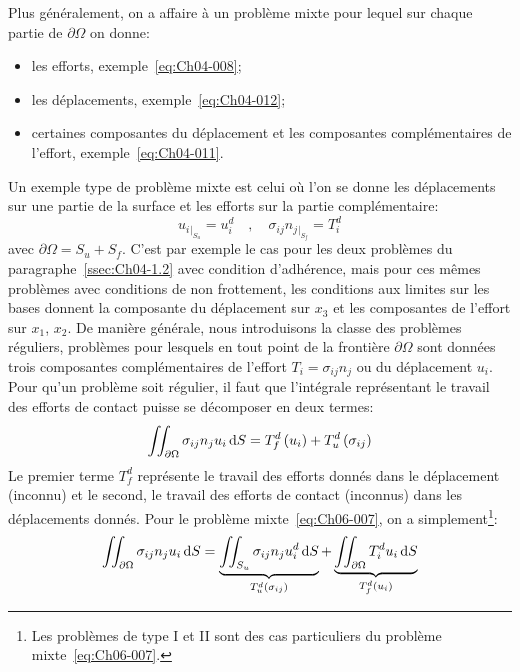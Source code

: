 Plus généralement, on a affaire à un problème mixte pour lequel sur chaque partie de $\partial \Omega$ on donne:
\begin{itemize}
    \item les efforts, exemple~\eqref{eq:Ch04-008}; 
    \item les déplacements, exemple~\eqref{eq:Ch04-012};
    \item certaines composantes du déplacement et les composantes complémentaires de l'effort, exemple~\eqref{eq:Ch04-011}.
\end{itemize}

Un exemple type de problème mixte est celui où l'on se donne les déplacements sur une partie de la surface et les efforts sur la partie complémentaire:
\begin{equation}
    u_i{}_{|_{S_u}} =  u_i^d \quad, \quad \sigma_{ij} n_j{}_{|_{S_f}} = T_i^d
    \label{eq:Ch06-007}
\end{equation}
avec $\partial \Omega = S_u + S_f$.
C'est par exemple le cas pour les deux problèmes du paragraphe~\ref{ssec:Ch04-1.2} avec condition d'adhérence, mais pour ces mêmes problèmes avec conditions de non frottement, les conditions aux limites sur les bases donnent la composante du déplacement sur $x_3$ et les composantes de l'effort sur $x_1$, $x_2$.
De manière générale, nous introduisons la classe des problèmes réguliers, problèmes pour lesquels en tout point de la frontière $\partial \Omega$ sont données trois composantes complémentaires de l'effort $T_i = \sigma_{ij} n_j$ ou du déplacement $u_i$.
Pour qu'un problème soit régulier, il faut que l'intégrale représentant le travail des efforts de contact puisse se décomposer en deux termes:
\begin{equation}
    \iint_{\partial \Omega} \sigma_{ij} n_j u_i \mathop{\mathrm{{}d}}\mathopen{} S = T_f^d \left( u_i \right) + T_u^d \left( \sigma_{ij} \right)
    \label{eq:Ch06-008}
\end{equation}
Le premier terme $T_f^d$ représente le travail des efforts donnés dans le déplacement (inconnu) et le second, le travail des efforts de contact (inconnus) dans les déplacements donnés.
Pour le problème mixte~\eqref{eq:Ch06-007}, on a simplement\footnote{Les problèmes de type I et II sont des cas particuliers du problème mixte~\eqref{eq:Ch06-007}.}:
\begin{equation}
    \iint_{\partial \Omega} \sigma_{ij} n_j u_i \mathop{\mathrm{{}d}}\mathopen{} S = \underbrace{\iint_{S_u} \sigma_{ij} n_j u_i^d \mathop{\mathrm{{}d}}\mathopen{} S}_{T_u^d\left( \sigma_{ij} \right)} +  \underbrace{\iint_{\partial \Omega} T_i^d u_i \mathop{\mathrm{{}d}}\mathopen{} S}_{T_f^d\left( u_i \right)}
    \label{eq:Ch06-009}
\end{equation}
